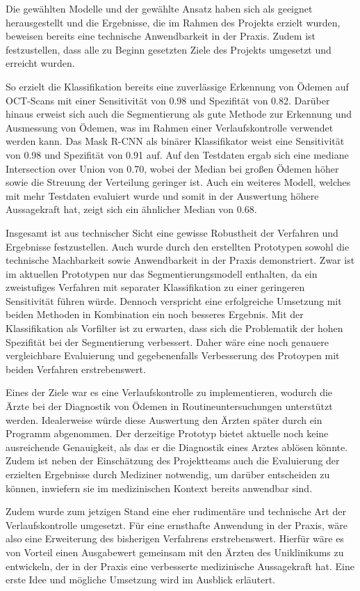 Die gewählten Modelle und der gewählte Ansatz haben sich als geeignet herausgestellt und die Ergebnisse, die im Rahmen des Projekts erzielt wurden, beweisen bereits eine technische Anwendbarkeit in der Praxis. 
Zudem ist festzustellen, dass alle zu Beginn gesetzten Ziele des Projekts umgesetzt und erreicht wurden.


So erzielt die Klassifikation bereits eine zuverlässige Erkennung von Ödemen auf OCT-Scans mit einer Sensitivität von 0.98 und Spezifität von 0.82.
Darüber hinaus erweist sich auch die Segmentierung als gute Methode zur Erkennung und Ausmessung von Ödemen, was im Rahmen einer Verlaufskontrolle verwendet werden kann. Das Mask R-CNN als binärer Klassifikator weist eine Sensitivität von 0.98 und Spezifität von 0.91 auf. Auf den Testdaten ergab sich eine mediane Intersection over Union von 0.70, wobei der Median bei großen Ödemen höher sowie die Streuung der Verteilung geringer ist. Auch ein weiteres Modell, welches mit mehr Testdaten evaluiert wurde und somit in der Auswertung höhere Aussagekraft hat, zeigt sich ein ähnlicher Median von 0.68.


Insgesamt ist aus technischer Sicht eine gewisse Robustheit der Verfahren und Ergebnisse festzustellen. 
Auch wurde durch den erstellten Prototypen sowohl die technische Machbarkeit sowie Anwendbarkeit in der Praxis demonstriert. Zwar ist im aktuellen Prototypen nur das Segmentierungsmodell enthalten, da ein zweistufiges Verfahren mit separater Klassifikation zu einer geringeren Sensitivität führen würde. Dennoch verspricht eine erfolgreiche Umsetzung mit beiden Methoden in Kombination ein noch besseres Ergebnis. 
Mit der Klassifikation als Vorfilter ist zu erwarten, dass sich die Problematik der hohen Spezifität bei der Segmentierung verbessert.
Daher wäre eine noch genauere vergleichbare Evaluierung und gegebenenfalls Verbesserung des Protoypen mit beiden Verfahren erstrebenswert.  


Eines der Ziele war es eine Verlaufskontrolle zu implementieren, wodurch die Ärzte bei der Diagnostik von Ödemen in Routineuntersuchungen unterstützt werden. Idealerweise würde diese Auswertung den Ärzten später durch ein Programm abgenommen. Der derzeitige Prototyp bietet aktuelle noch keine ausreichende Genauigkeit, als das er die Diagnostik eines Arztes ablösen könnte. Zudem ist neben der Einschätzung des Projektteams auch die Evaluierung der erzielten Ergebnisse durch Mediziner notwendig, um darüber entscheiden zu können, inwiefern sie im medizinischen Kontext bereits anwendbar sind. 

Zudem wurde zum jetzigen Stand eine eher rudimentäre und technische Art der Verlaufskontrolle umgesetzt. Für eine ernsthafte Anwendung in der Praxis, wäre also eine Erweiterung des bisherigen Verfahrens erstrebenswert. Hierfür wäre es von Vorteil einen Ausgabewert gemeinsam mit den Ärzten des Uniklinikums zu entwickeln, der in der Praxis eine verbesserte medizinische Aussagekraft hat. 
Eine erste Idee und mögliche Umsetzung wird im Ausblick erläutert. 




